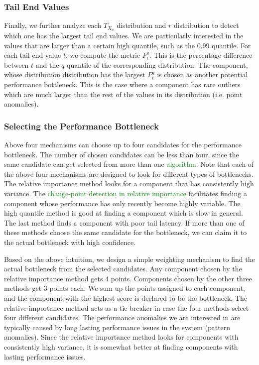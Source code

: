 \subsubsection{Tail End Values}
\label{sec:tailend}
Finally, we further analyze each $T_{X_n}$ distribution and $r$ distribution to detect which one has the largest tail end values.
We are particularly interested in the values that are larger than a certain high quantile, such as the 0.99 quantile.
For each tail end value $t$, we compute the metric $P^q_t$. This is the percentage difference between $t$ and the
$q$ quantile of the corresponding distribution. The component, whose distribution distribution has
the largest $P^q_t$ is chosen as another potential performance bottleneck.
This is the case where a component has rare outliers which are much larger than the rest of 
the values in its distribution (i.e. point anomalies).

\subsubsection{Selecting the Performance Bottleneck}
Above four mechanisms can choose up to four candidates for the performance bottleneck. The number of
chosen candidates can be less than four, since the same candidate can get selected from more than
one 
\textcolor{green}{algorithm}.  Note that each of the above four mechanisms are designed to look for different
types of bottlenecks. The relative importance method looks for a component that has consistently
high variance. The 
\textcolor{green}{change-point detection in relative importance}
facilitates finding a component whose
performance has only recently become highly variable. The high quantile method is good at
finding a component which is slow in general. The last method finds a component with poor
tail latency. If more than one of these methods choose the same candidate for the bottleneck,
we can claim it to the actual bottleneck with high confidence.

Based on the above intuition, we design a simple weighting mechanism to find the actual
bottleneck from the selected candidates. Any component chosen by the relative importance
method gets 4 points. Components chosen by the other three methods get 3 points each. 
We sum up the points assigned to each component, and the component with the highest
score is declared to be the bottleneck. The relative importance method acts as a tie breaker
in case the four methods select four different candidates. The performance anomalies we
are interested in are typically caused by long lasting performance issues in the system 
(pattern anomalies). Since the relative importance method looks for components with
consistently high variance, it is somewhat better at finding components
with lasting performance issues.
